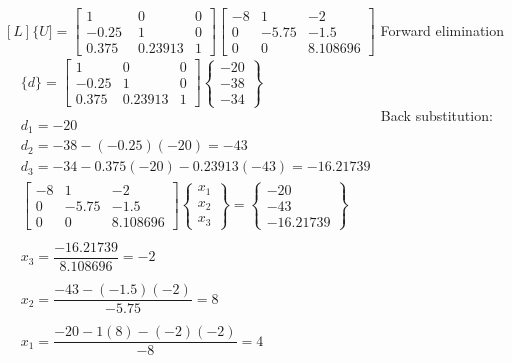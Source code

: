 \documentclass[../main.tex]{subfiles}
\begin{document}
$[L]\{U]=\left[\begin{array}{c}1 \\ -0.25 \\ 0.375\end{array}\right.$
$\left.\begin{array}{cc}0 & 0 \\ 1 & 0 \\ 0.23913 & 1\end{array}\right]\left[\begin{array}{ccc}-8 & 1 & -2 \\ 0 & -5.75 & -1.5 \\ 0 & 0 & 8.108696\end{array}\right]$
\bigbreak
Forward elimination
\bigbreak$
\begin{aligned}
&\{d\}=\left[\begin{array}{ccc}
1 & 0 & 0 \\
-0.25 & 1 & 0 \\
0.375 & 0.23913 & 1
\end{array}\right]\left\{\begin{array}{l}
-20 \\
-38 \\
-34
\end{array}\right\}\\\\
&d_{1}=-20 \\
&d_{2}=-38-(-0.25)(-20)=-43 \\
&d_{3}=-34-0.375(-20)-0.23913(-43)=-16.21739
\end{aligned}$
\bigbreak
Back substitution:
\bigbreak$
\begin{aligned}
&{\left[\begin{array}{ccc}
-8 & 1 & -2 \\
0 & -5.75 & -1.5 \\
0 & 0 & 8.108696
\end{array}\right]\left\{\begin{array}{l}
x_{1} \\
x_{2} \\
x_{3}
\end{array}\right\}=\left\{\begin{array}{c}
-20 \\
-43 \\
-16.21739
\end{array}\right\}} \\\\
&x_{3}=\dfrac{-16.21739}{8.108696}=-2 \\\\
&x_{2}=\dfrac{-43-(-1.5)(-2)}{-5.75}=8 \\\\
&x_{1}=\dfrac{-20-1(8)-(-2)(-2)}{-8}=4
\end{aligned}$
\bigbreak
\end{document}
